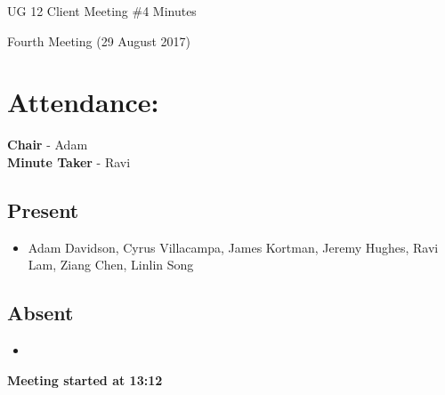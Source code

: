 \documentclass{article}
\begin{document}
\begin{adjustwidth}{2.5em}{0pt}
\begin{center}
\Large{UG 12 Client Meeting \#4  Minutes}\\
\end{center}
\end{adjustwidth}

Fourth Meeting (29 August 2017)
\section{Attendance:}
\textbf{Chair} - Adam\\
\textbf{Minute Taker} - Ravi\\
\subsection*{Present}
\begin{itemize}
\item Adam Davidson, Cyrus Villacampa, James Kortman, Jeremy Hughes, Ravi Lam, Ziang Chen, Linlin Song
\end{itemize}
\subsection*{Absent}
\begin{itemize}
\item  
\end {itemize}
\textbf{Meeting started at 13:12}
\end{document}
